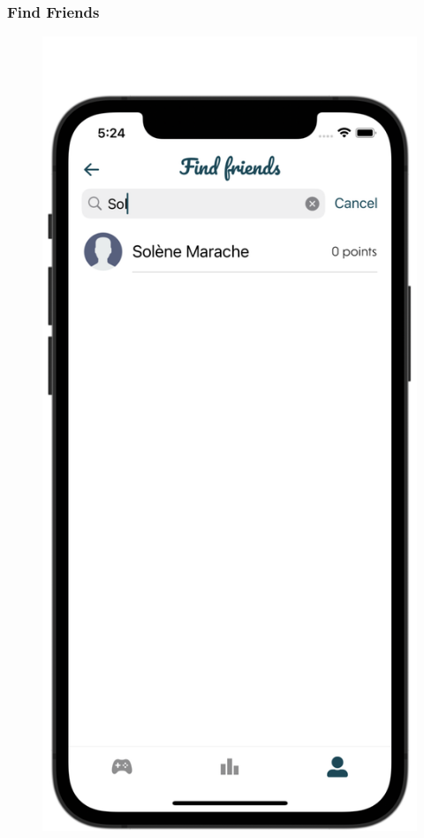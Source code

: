 \subsubsection{Find Friends}

\begin{figure}[H]
    \centering
    \begin{minipage}[b]{0.43\linewidth}
        \centering
        \includegraphics[width=\linewidth]{Mobile UI/Find Friends.png}

\end{minipage}
\end{figure}

